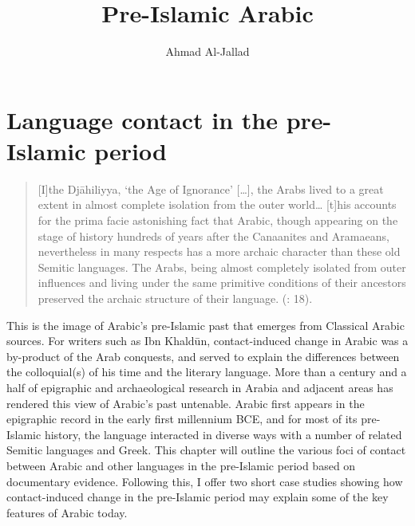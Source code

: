 \documentclass[output=paper]{langsci/langscibook}
\author{Ahmad Al-Jallad\affiliation{The Ohio State University}}
\title{Pre-Islamic Arabic}
\begin{document}
  
\section{Language contact in the pre-Islamic period}

\begin{quote}
[I]the Djāhiliyya, ‘the Age of Ignorance’ […], the Arabs lived to a great extent in almost complete isolation from the outer world… [t]his accounts for the prima facie astonishing fact that Arabic, though appearing on the stage of history hundreds of years after the Canaanites and Aramaeans, nevertheless in many respects has a more archaic character than these old Semitic languages. The Arabs, being almost completely isolated from outer influences and living under the same primitive conditions of their ancestors preserved the archaic structure of their language. (\citealt{Blau1981}: 18).
\end{quote}
This is the image of Arabic’s pre-Islamic past that emerges from Classical Arabic sources. For writers such as Ibn Khaldūn, contact-induced change in Arabic was a by-product of the Arab conquests, and served to explain the differences between the colloquial(s) of his time and the literary language. More than a century and a half of epigraphic and archaeological research in Arabia and adjacent areas has rendered this view of Arabic’s past untenable. Arabic first appears in the epigraphic record in the early first millennium BCE, and for most of its pre-Islamic history, the language interacted in diverse ways with a number of related Semitic languages and Greek. This chapter will outline the various foci of contact between Arabic and other languages in the pre-Islamic period based on documentary evidence. Following this, I offer two short case studies showing how contact-induced change in the pre-Islamic period may explain some of the key features of Arabic today.   
\end{document}
